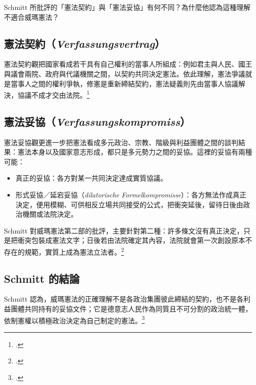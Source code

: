\begin{qaquestion}
Schmitt 所批評的「憲法契約」與「憲法妥協」有何不同？為什麼他認為這種理解不適合威瑪憲法？
\end{qaquestion}

\subsection{\texorpdfstring{憲法契約（\emph{Verfassungsvertrag}）}{憲法契約（Verfassungsvertrag）}}

憲法契約觀把國家看成若干具有自己權利的當事人所組成：例如君主與人民、國王與議會兩院、政府與代議機關之間，以契約共同決定憲法。依此理解，憲法爭議就是當事人之間的權利爭執，修憲是重新締結契約，憲法疑義則先由當事人協議解決，協議不成才交由法院。\footcites[120--122]{schmitt2015}[40--43]{schmitt1931}

\subsection{\texorpdfstring{憲法妥協（\emph{Verfassungskompromiss}）}{憲法妥協（Verfassungskompromiss）}}

憲法妥協觀更進一步把憲法看成多元政治、宗教、階級與利益團體之間的談判結果：憲法本身以及國家意志形成，都只是多元勢力之間的妥協。這裡的妥協有兩種可能：

\begin{itemize}
\tightlist
\item
  真正的妥協：各方對某一共同決定達成實質協議。
\item
  形式妥協／延宕妥協（\emph{dilatorische Formelkompromisse}）：各方無法作成真正決定，便用模糊、可供相反立場共同接受的公式，把衝突延後，留待日後由政治機關或法院決定。
\end{itemize}

Schmitt 對威瑪憲法第二部的批評，主要針對第二種：許多條文沒有真正決定，只是把衝突包裝成憲法文字；日後若由法院確定其內容，法院就會第一次創設原本不存在的規範，實質上成為憲法立法者。\footcites[119--120]{schmitt2015}[47--48]{schmitt1931}

\subsection{Schmitt 的結論}

Schmitt 認為，威瑪憲法的正確理解不是各政治集團彼此締結的契約，也不是各利益團體共同持有的妥協文件；它是德意志人民作為同質且不可分割的政治統一體，依制憲權以積極政治決定為自己制定的憲法。\footcites[122]{schmitt2015}[62]{schmitt1931}

